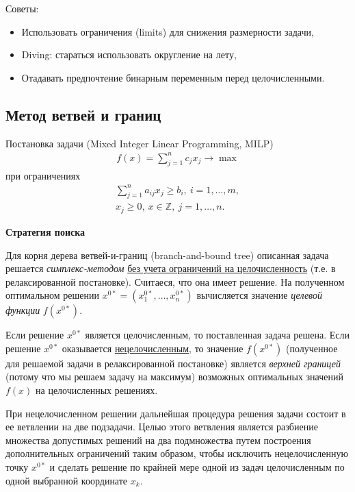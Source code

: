 \documentclass[%
	11pt,
	a4paper,
	utf8,
		]{article}
\begin{document}
Советы:
\begin{itemize}
	\item Использовать ограничения (limits) для снижения размерности задачи,
	
	\item Diving: стараться использовать округление на лету,
	
	\item Отадавать предпочтение бинарным переменным перед целочисленными. 
\end{itemize}

\subsection{Метод ветвей и границ}

Постановка задачи (Mixed Integer Linear Programming, MILP)
\begin{align*}
	f(x) = \sum_{j=1}^{n} c_j x_j \rightarrow \max
\end{align*}
при ограничениях
\begin{align*}
	\sum_{j=1}^{n} a_{ij} x_j \geqslant b_i, \ i = 1, \ldots, m,\\
	x_j \geqslant 0, \ x \in \mathbb{Z}, \ j = 1, \ldots, n.
\end{align*}


\textbf{Стратегия поиска}

Для корня дерева ветвей-и-границ (branch-and-bound tree) описанная задача решается \emph{симплекс-методом} \underline{без учета ограничений на целочисленность} (т.е. в релаксированной постановке). Считаеся, что она имеет решение. На полученном оптимальном решении $ x^{0*} = (x_1^{0*}, \ldots, x_n^{0*}) $ вычисляется значение \emph{целевой функции} $ f(x^{0*}) $.

Если решение $ x^{0*} $ является целочисленным, то поставленная задача решена. Если решение $ x^{0*} $ оказывается \underline{нецелочисленным}, то значение $ f(x^{0*}) $ (полученное для решаемой задачи в релаксированной постановке) является \emph{верхней границей} (потому что мы решаем задачу на максимум) возможных оптимальных значений $ f(x) $ на целочисленных решениях.

При нецелочисленном решении дальнейшая процедура решения задачи состоит в ее ветвлении на две подзадачи. Целью этого ветвления является разбиение множества допустимых решений на два подмножества путем построения дополнительных ограничений таким образом, чтобы исключить нецелочисленную точку $ x^{0*} $ и сделать решение по крайней мере одной из задач целочисленным по одной выбранной координате $ x_k $.
\end{document}
